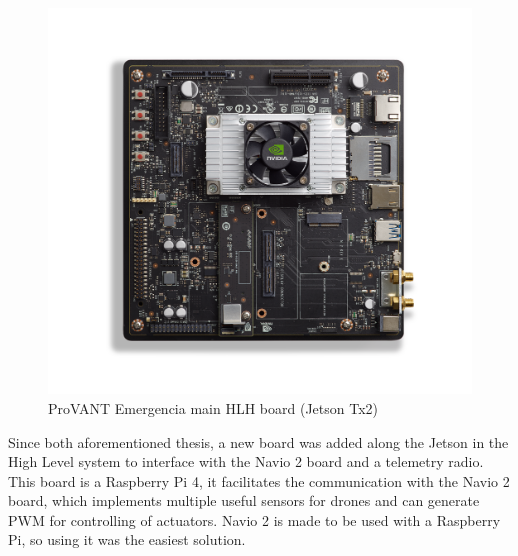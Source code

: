 \begin{figure}[htb]
	\caption{\label{fig:jetson}ProVANT Emergencia main \gls{HLH} board (Jetson Tx2)}
	\begin{center}
	    \includegraphics[width=.7\linewidth,trim=2.5cm 2cm 2.5cm 2cm]{images/JTX2_Devkit.png}
	\end{center}
\end{figure}

Since both aforementioned thesis, a new board was added along the Jetson in the High Level system to interface with the Navio 2 board and a telemetry radio. This board is a Raspberry Pi 4, it facilitates the communication with the Navio 2 board, which implements multiple useful sensors for drones and can generate \gls{PWM} for controlling of actuators. Navio 2 is made to be used with a Raspberry Pi, so using it was the easiest solution.

